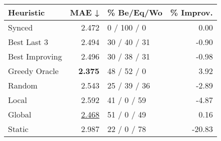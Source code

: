 \begin{tabular}{lrlr}
\toprule
\textbf{Heuristic} & \textbf{MAE ↓} & \textbf{\% Be/Eq/Wo} & \textbf{\% Improv.} \\
\midrule
            Synced &          2.472 &          0 / 100 / 0 &                0.00 \\
\midrule
       Best Last 3 &          2.494 &         30 / 40 / 31 &               -0.90 \\
    Best Improving &          2.496 &         30 / 38 / 31 &               -0.98 \\
\addlinespace
     Greedy Oracle &          \textbf{2.375} &          48 / 52 / 0 &                3.92 \\
            Random &          2.543 &         25 / 39 / 36 &               -2.89 \\
\midrule
             Local &          2.592 &          41 / 0 / 59 &               -4.87 \\
            Global &          \underline{2.468} &          51 / 0 / 49 &                0.16 \\
\midrule
            Static &          2.987 &          22 / 0 / 78 &              -20.83 \\
\bottomrule
\end{tabular}

\label{tab:hr_non_lr05_le2_bs2_Summary}
